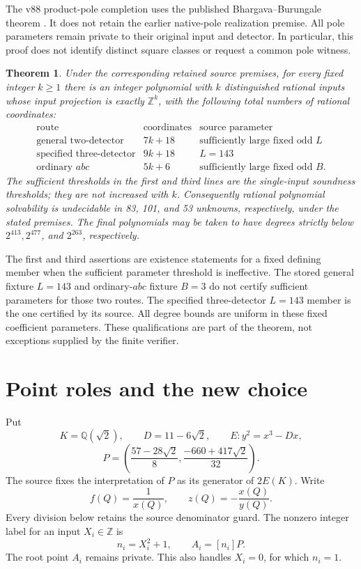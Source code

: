 \documentclass[11pt]{article}
\newtheorem{theorem}{Theorem}
\newcommand{\Q}{\mathbb Q}
\newcommand{\Z}{\mathbb Z}
\begin{document}
The v88 product-pole completion uses the published
Bhargava--Burungale theorem \cite{BB}. It does not retain the earlier
native-pole realization premise. All pole parameters remain private
to their original input and detector. In particular, this proof
does not identify distinct square classes or request a common pole
witness.

\begin{theorem}\label{thm:main}
Under the corresponding retained source premises, for every fixed
integer \(k\ge1\) there is an integer polynomial with \(k\)
distinguished rational inputs whose input projection is exactly
\(\Z^k\), with the following total numbers of rational coordinates:
\[
\begin{array}{c|c|c}
\text{route}&\text{coordinates}&\text{source parameter}\\ \hline
\text{general two-detector}&7k+18&\text{sufficiently large fixed odd }L\\
\text{specified three-detector}&9k+18&L=143\\
\text{ordinary }abc&5k+6&\text{sufficiently large fixed odd }B .
\end{array}
\]
The sufficient thresholds in the first and third lines are the
single-input soundness thresholds; they are not increased with \(k\).
Consequently rational polynomial solvability is undecidable in
83, 101, and 53 unknowns, respectively, under the stated premises.
The final polynomials may be taken to have degrees strictly below
\(2^{413},2^{477}\), and \(2^{263}\), respectively.
\end{theorem}

The first and third assertions are existence statements for a fixed
defining member when the sufficient parameter threshold is ineffective.
The stored general fixture \(L=143\) and ordinary-\(abc\) fixture \(B=3\)
do not certify sufficient parameters for those two routes. The specified
three-detector \(L=143\) member is the one certified by its source.
All degree bounds are uniform in these fixed coefficient parameters.
These qualifications are part of the theorem, not exceptions supplied
by the finite verifier.

\section{Point roles and the new choice}
\label{sec:roles}

Put
\[
 K=\Q(\sqrt2),\qquad D=11-6\sqrt2,\qquad E:y^2=x^3-Dx,
\]
\[
 P=\left(\frac{57-28\sqrt2}{8},\frac{-660+417\sqrt2}{32}\right).
\]
The source fixes the interpretation of \(P\) as its generator of
\(2E(K)\). Write
\[
              f(Q)=\frac1{x(Q)},\qquad z(Q)=-\frac{x(Q)}{y(Q)}.
\]
Every division below retains the source denominator guard.
The nonzero integer label for an input \(X_i\in\Z\) is
\[
                    n_i=X_i^2+1,\qquad A_i=[n_i]P .
\]
The root point \(A_i\) remains private. This also handles \(X_i=0\),
for which \(n_i=1\).
\end{document}
